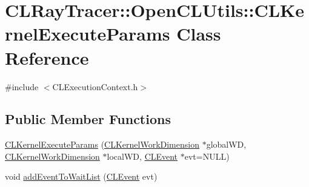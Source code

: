 \hypertarget{class_c_l_ray_tracer_1_1_open_c_l_utils_1_1_c_l_kernel_execute_params}{}\section{C\+L\+Ray\+Tracer\+:\+:Open\+C\+L\+Utils\+:\+:C\+L\+Kernel\+Execute\+Params Class Reference}
\label{class_c_l_ray_tracer_1_1_open_c_l_utils_1_1_c_l_kernel_execute_params}


{\ttfamily \#include $<$C\+L\+Execution\+Context.\+h$>$}

\subsection*{Public Member Functions}
\begin{DoxyCompactItemize}
\item 
\hyperlink{class_c_l_ray_tracer_1_1_open_c_l_utils_1_1_c_l_kernel_execute_params_a3b459bbfe18d2659f172c451a30107a5}{C\+L\+Kernel\+Execute\+Params} (\hyperlink{class_c_l_ray_tracer_1_1_open_c_l_utils_1_1_c_l_kernel_work_dimension}{C\+L\+Kernel\+Work\+Dimension} $\ast$global\+WD, \hyperlink{class_c_l_ray_tracer_1_1_open_c_l_utils_1_1_c_l_kernel_work_dimension}{C\+L\+Kernel\+Work\+Dimension} $\ast$local\+WD, \hyperlink{class_c_l_ray_tracer_1_1_open_c_l_utils_1_1_c_l_event}{C\+L\+Event} $\ast$evt=N\+U\+LL)
\item 
void \hyperlink{class_c_l_ray_tracer_1_1_open_c_l_utils_1_1_c_l_kernel_execute_params_a862d87802bc433ac8acf1cd3eeed71d4}{add\+Event\+To\+Wait\+List} (\hyperlink{class_c_l_ray_tracer_1_1_open_c_l_utils_1_1_c_l_event}{C\+L\+Event} evt)
\end{DoxyCompactItemize}
